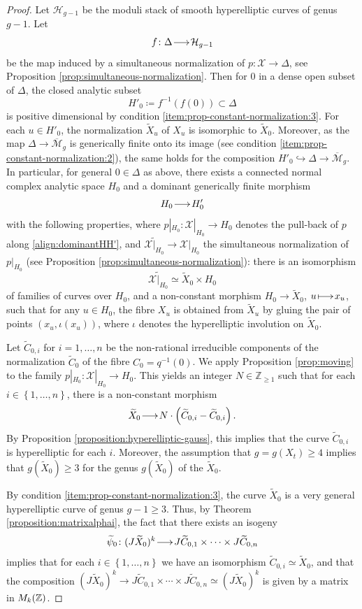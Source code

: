 \documentclass[a4paper,11pt,reqno]{amsart}
\makeatletter
\numberwithin{equation}{section}
\theoremstyle{plain}
\theoremstyle{definition}
\newcommand{\Z}{\mathbb Z}
\let\rm\relax
\newcommand{\rm}[1]{{\mathrm{#1}}}
\newcommand{\ca}[1]{{\mathcal{#1}}}
\newcommand{\wt}[1]{{\widetilde{#1}}}
\renewcommand{\longrightarrow}{\xymatrix@1@=15pt{\ar[r]&}}
\renewcommand{\mapsto}{\xymatrix@1@=15pt{\ar@{|->}[r]&}}
\renewcommand{\cong}{\simeq}
\newcommand{\set}[1]{\left\{ #1 \right\}}
\makeatother
\begin{document}
    \begin{proof}
Let $\ca H_{g-1}$ be the moduli stack of smooth hyperelliptic curves of genus $g-1$. 
Let $$f \colon \Delta \longrightarrow \ca H_{g-1}$$ be the map induced by a simultaneous normalization of $p \colon \ca X \to \Delta$, see Proposition \ref{prop:simultaneous-normalization}. 
Then for $0$ in a dense open subset of $\Delta$, the closed analytic subset $$H'_0 \coloneqq f^{-1}(f(0)) \subset  \Delta$$ is positive dimensional by condition \ref{item:prop-constant-normalization:3}. 
For each $u \in H'_0$, the normalization $\wt X_u$ of $X_u$ is isomorphic to $\wt X_0$. 
Moreover, as the map $\Delta \to \overline{\ca M}_g$ is generically finite onto its image (see condition \ref{item:prop-constant-normalization:2}), the same holds for the composition $H'_0 \hookrightarrow \Delta \to \overline{\ca M}_g$. 
In particular, for general $0 \in \Delta$ as above, there exists a connected normal complex analytic space $H_0$ and a dominant generically finite morphism 
\begin{align} \label{align:dominantHH'}
H_0 \longrightarrow H'_0
\end{align}
with the following properties, where $p|_{H_0} \colon \ca X|_{H_0} \to H_0$ denotes the pull-back of $p$ along \eqref{align:dominantHH'}, and $\widetilde{\mathcal X|_{H_0}} \to \ca X|_{H_0}$ the simultaneous normalization of $p|_{H_0}$ (see Proposition \ref{prop:simultaneous-normalization}): 
there is an isomorphism
$$
\widetilde{\mathcal X|_{H_0}}\cong  \widetilde X_0\times H_0
$$
of families of curves over $H_0$, and a non-constant morphism $H_0 \to \widetilde X_0$, $u\mapsto x_u$, such that for any $u\in H_0$, the fibre $X_u$ is obtained from $\widetilde X_u$ by gluing the pair of points $(x_u,\iota(x_u))$, where $\iota$ denotes the hyperelliptic involution on $\widetilde X_0$. 

Let $\widetilde C_{0,i}$ for $i=1,\dots ,n$ be the non-rational irreducible components of the normalization $\widetilde C_0$ of the fibre $C_0=q^{-1}(0)$.  
We apply Proposition \ref{prop:moving} to the family $p|_{H_0} \colon \ca X|_{H_0} \to H_0$. This yields an integer $N \in \Z_{\geq 1}$ such that for each $i \in \set{1, \dotsc, n}$, there is a non-constant morphism
\[
\wt X_0 \longrightarrow
N \cdot \left(
\wt C_{0,i} - \wt C_{0,i}
\right).
\]
By Proposition \ref{proposition:hyperelliptic-gauss}, this implies that the curve $\wt C_{0,i}$ is hyperelliptic for each $i$. Moreover, the assumption that $g = g(X_t) \geq 4$ implies that $g(\wt X_0) \geq 3$ for the genus $g(\wt X_0)$ of the $\wt X_0$. 

By condition \ref{item:prop-constant-normalization:3}, the curve $\wt X_0$ is a very general hyperelliptic curve of genus $g-1 \geq 3$. Thus, by Theorem \ref{proposition:matrixalphai}, the fact that there exists an isogeny
$$
\wt \psi_0 \colon (J\wt X_0)^k
\longrightarrow
J \wt C_{0,1} \times \cdots \times J\wt C_{0,n}$$ implies that for each $i \in \set{1, \dotsc, n}$ we have an isomorphism $\wt C_{0,i} \cong \wt X_0$, and that the composition 
$
(J\wt X_0)^k \to
J \wt C_{0,1} \times \cdots \times J\wt C_{0,n} \cong (J\wt X_0)^k
$
is given by a matrix in $ \rm{M}_k(\Z)$. 
\end{proof}
\end{document}

